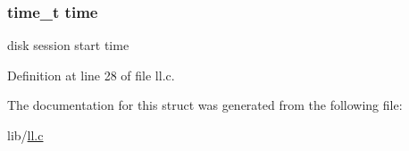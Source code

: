 \hypertarget{structdisk__ent_ab842bdb7d02be824fb48613032b4ff36}{}
\subsubsection[{time}]{\setlength{\rightskip}{0pt plus 5cm}time\+\_\+t time}\label{structdisk__ent_ab842bdb7d02be824fb48613032b4ff36}
disk session start time 

Definition at line 28 of file ll.\+c.



The documentation for this struct was generated from the following file\+:\begin{DoxyCompactItemize}
\item 
lib/\hyperlink{ll_8c}{ll.\+c}\end{DoxyCompactItemize}
